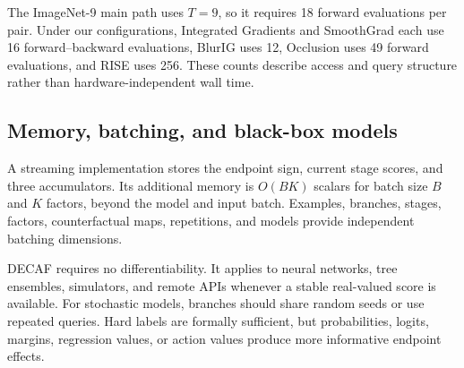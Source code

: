 The ImageNet-9 main path uses $T=9$, so it requires 18 forward evaluations per pair. Under our configurations, Integrated Gradients and SmoothGrad each use 16 forward--backward evaluations, BlurIG uses 12, Occlusion uses 49 forward evaluations, and RISE uses 256. These counts describe access and query structure rather than hardware-independent wall time.

\subsection{Memory, batching, and black-box models}

A streaming implementation stores the endpoint sign, current stage scores, and three accumulators. Its additional memory is $O(BK)$ scalars for batch size $B$ and $K$ factors, beyond the model and input batch. Examples, branches, stages, factors, counterfactual maps, repetitions, and models provide independent batching dimensions.

DECAF requires no differentiability. It applies to neural networks, tree ensembles, simulators, and remote APIs whenever a stable real-valued score is available. For stochastic models, branches should share random seeds or use repeated queries. Hard labels are formally sufficient, but probabilities, logits, margins, regression values, or action values produce more informative endpoint effects.
